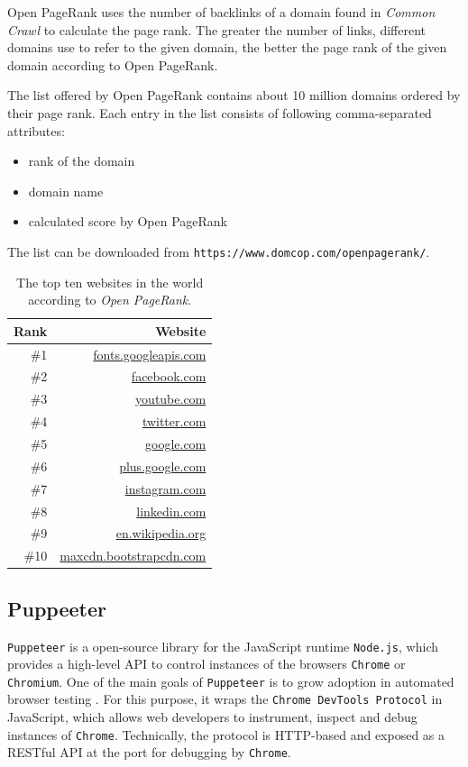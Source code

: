 Open PageRank uses the number of backlinks of a domain found in \textit{Common Crawl} to calculate the page rank. The greater the number of links, different domains use to refer to the given domain, the better the page rank of the given domain according to Open PageRank.

The list offered by Open PageRank contains about 10 million domains ordered by their page rank. Each entry in the list consists of following comma-separated attributes:

\begin{itemize}
	\item rank of the domain
	\item domain name
	\item calculated score by Open PageRank
\end{itemize}

The list can be downloaded from \texttt{https://www.domcop.com/openpagerank/}.

\begin{table}[]
	\center
	\begin{tabular}{r|r}
		\textbf{Rank} & Website  \\ \hline \hline
		\#1 & \url{fonts.googleapis.com} \\ \hline
		\#2 & \url{facebook.com} \\ \hline
		\#3 & \url{youtube.com} \\ \hline
		\#4 & \url{twitter.com} \\ \hline
		\#5 & \url{google.com} \\ \hline
		\#6 & \url{plus.google.com} \\ \hline
		\#7 & \url{instagram.com} \\ \hline
		\#8 & \url{linkedin.com}\\ \hline
		\#9 & \url{en.wikipedia.org}\\ \hline
		\#10 & \url{maxcdn.bootstrapcdn.com}\\
	\end{tabular}
	\caption[List of top ten websites from \textit{Open PageRank}]{The top ten websites in the world according to \textit{Open PageRank}.}
	\label{table_human_eval_results}
\end{table}


\subsection{Puppeeter}
\label{puppeeter}
\texttt{Puppeteer} is a open-source library for the JavaScript runtime \texttt{Node.js}, which provides a high-level API to control instances of the browsers \texttt{Chrome} or \texttt{Chromium}. One of the main goals of \texttt{Puppeteer} is to grow adoption in automated browser testing \cite{PuppeteerFAQ}.  For this purpose, it wraps the \texttt{Chrome DevTools Protocol} in JavaScript, which allows web developers to instrument, inspect and debug instances of \texttt{Chrome}. Technically, the protocol is HTTP-based and exposed as a RESTful API at the port for debugging by \texttt{Chrome}.

